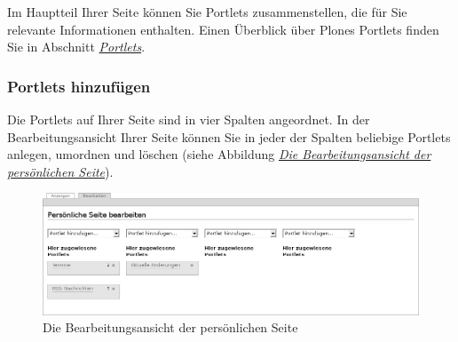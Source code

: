 \documentclass[a4paper,12pt,ngerman]{manual}
\begin{document}
Im Hauptteil Ihrer Seite können Sie Portlets
zusammenstellen, die für Sie relevante Informationen enthalten. Einen
Überblick über Plones Portlets finden Sie in Abschnitt \hyperlink{sec-portlets}{\emph{Portlets}}.


\subsubsection{Portlets hinzufügen}

Die Portlets auf Ihrer Seite sind in vier Spalten angeordnet. In der
Bearbeitungsansicht Ihrer Seite können Sie in jeder der Spalten beliebige
Portlets anlegen, umordnen und löschen (siehe
Abbildung \hyperlink{fig-persoenliche-seite-bearbeiten}{\emph{Die Bearbeitungsansicht der persönlichen Seite}}).
\hypertarget{fig-persoenliche-seite-bearbeiten}{}\begin{figure}[htbp]
\centering

\includegraphics{persoenliche-seite-bearbeiten.png}
\caption{Die Bearbeitungsansicht der persönlichen Seite}\end{figure}
\end{document}
